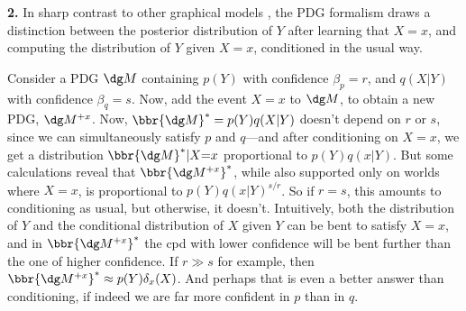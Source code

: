\textbf{2.}
In sharp contrast to other graphical models \parencite[pg 26]{koller2009probabilistic},
the PDG formalism draws a distinction between
the posterior distribution of $Y$ after learning that $X{=}x$,
and computing the distribution of $Y$ given $X{=}x$, conditioned in the usual way.

\begin{example}
	Consider a PDG $\dg M$ containing $p(Y)$ with confidence
    $\beta_p = r$, and $q(X|Y)$ with confidence $\beta_q = s$.
    Now, add the event $X{=}x$ to $\dg M$, to obtain
    a new PDG, $\dg M^{+x}$.
	Now, $\bbr{\dg M}^* = p(Y)q(X|Y)$ doesn't depend on $r$ or $s$, since we can simultaneously satisfy $p$ and $q$---and after conditioning on $X{=}x$, we get a distribution $\bbr{\dg M}^* | X{=}x$ proportional to $p(Y) q(x|Y)$.
	But some calculations reveal that $\bbr{\dg M^{+x}}^*$,
    while also supported only on worlds where $X{=}x$, is proportional to
	$p(Y) q(x|Y)^{s/r}$.
	So if $r = s$,
    this amounts to conditioning as usual, but otherwise,
    it doesn't.
    Intuitively, both the distribution of $Y$ and the conditional distribution of $X$ given $Y$ can be bent to satisfy $X{=}x$, and in $\bbr{\dg M^{+x}}^*$ the cpd with lower confidence will be bent further than the one of higher confidence.
    If $r \gg s$ for example,
    then $\bbr{\dg M^{+x}}^* \approx
    p(Y) \delta_x(X)$.
    And perhaps that is even a better answer than conditioning, if indeed we are far more confident in $p$ than in $q$.
\end{example}

